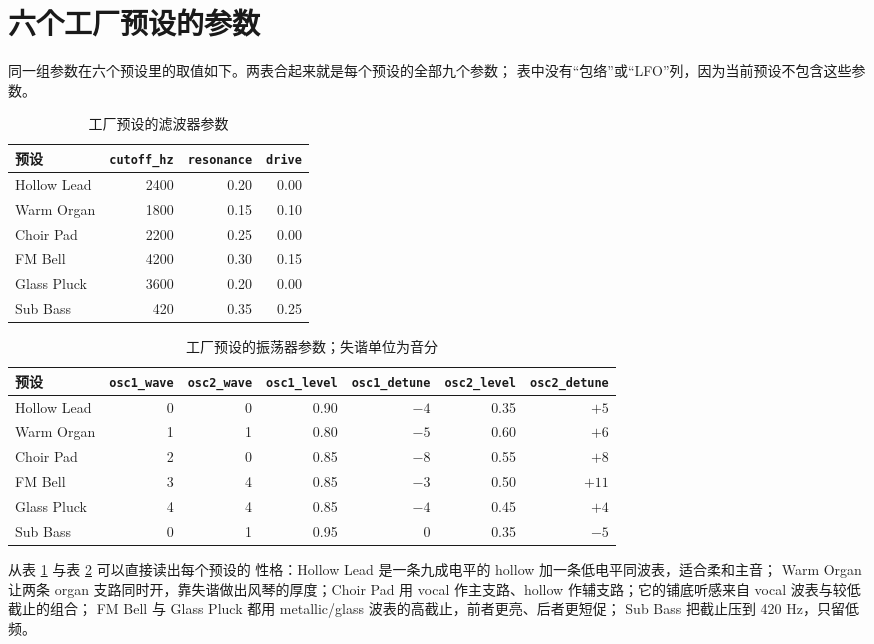 \section{六个工厂预设的参数}

同一组参数在六个预设里的取值如下。两表合起来就是每个预设的全部九个参数；
表中没有“包络”或“LFO”列，因为当前预设不包含这些参数。

\begin{table}[htbp]
\centering
\small
\begin{tabular}{@{}lrrr@{}}
\hline
预设 & \texttt{cutoff\_hz} & \texttt{resonance} & \texttt{drive} \\
\hline
Hollow Lead & 2400 & 0.20 & 0.00 \\
Warm Organ & 1800 & 0.15 & 0.10 \\
Choir Pad & 2200 & 0.25 & 0.00 \\
FM Bell & 4200 & 0.30 & 0.15 \\
Glass Pluck & 3600 & 0.20 & 0.00 \\
Sub Bass & 420 & 0.35 & 0.25 \\
\hline
\end{tabular}
\caption{工厂预设的滤波器参数}
\label{tab:preset-filter}
\end{table}

\begin{table}[htbp]
\centering
\small
\begin{tabular}{@{}lrrrrrr@{}}
\hline
预设 & \texttt{osc1\_wave} & \texttt{osc2\_wave} & \texttt{osc1\_level} & \texttt{osc1\_detune} & \texttt{osc2\_level} & \texttt{osc2\_detune} \\
\hline
Hollow Lead & 0 & 0 & 0.90 & $-4$ & 0.35 & $+5$ \\
Warm Organ & 1 & 1 & 0.80 & $-5$ & 0.60 & $+6$ \\
Choir Pad & 2 & 0 & 0.85 & $-8$ & 0.55 & $+8$ \\
FM Bell & 3 & 4 & 0.85 & $-3$ & 0.50 & $+11$ \\
Glass Pluck & 4 & 4 & 0.85 & $-4$ & 0.45 & $+4$ \\
Sub Bass & 0 & 1 & 0.95 & $0$ & 0.35 & $-5$ \\
\hline
\end{tabular}
\caption{工厂预设的振荡器参数；失谐单位为音分}
\label{tab:preset-osc}
\end{table}

从表 \ref{tab:preset-filter} 与表 \ref{tab:preset-osc} 可以直接读出每个预设的
性格：Hollow Lead 是一条九成电平的 hollow 加一条低电平同波表，适合柔和主音；
Warm Organ 让两条 organ 支路同时开，靠失谐做出风琴的厚度；Choir Pad 用 vocal
作主支路、hollow 作辅支路；它的铺底听感来自 vocal 波表与较低截止的组合；
FM Bell 与 Glass Pluck 都用 metallic/glass 波表的高截止，前者更亮、后者更短促；
Sub Bass 把截止压到 420 Hz，只留低频。

